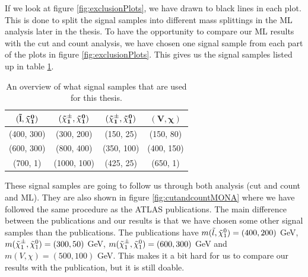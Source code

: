 If we look at figure \ref{fig:exclusionPlots}, we have drawn to black lines in each plot. This is done to split the signal samples into different mass splittings in the ML analysis later in the thesis. To have the opportunity to compare our ML results with the cut and count analysis, we have chosen one signal sample from each part of the plots in figure \ref{fig:exclusionPlots}. This gives us the signal samples listed up in table \ref{tab:sigsampcutandcount}.
\begin{table}[H]
    \centering
    \begin{tabular}{c c c c}
    \toprule
    $\mathbf{(\Tilde{l}, \Tilde{\chi}_1^0)}$ & $\mathbf{(\Tilde{\chi}_1^\pm, \Tilde{\chi}_1^0)}$ & $\mathbf{(\Tilde{\chi}_1^\pm, \Tilde{\chi}_1^0)}$ & $\mathbf{( V, \chi)}$  \\
    \midrule
    \midrule
    (400, 300) & (300, 200) & (150, 25) & (150, 80)\\
    (600, 300) & (800, 400) & (350, 100) & (400, 150)\\
    (700, 1) & (1000, 100) & (425, 25) & (650, 1)\\
    \bottomrule
    \end{tabular}
    \caption{An overview of what signal samples that are used for this thesis.}
    \label{tab:sigsampcutandcount}
\end{table}

These signal samples are going to follow us through both analysis (cut and count and ML). They are also shown in figure \ref{fig:cutandcountMONA} where we have followed the same procedure as the ATLAS publications. The main difference between the publications and our results is that we have chosen some other signal samples than the publications. The publications have $m(\Tilde{l}, \Tilde{\chi}_1^0) = (400, 200)$ GeV, $m(\Tilde{\chi}_1^\pm, \Tilde{\chi}_1^0) = (300, 50)$ GeV, $m(\Tilde{\chi}_1^\pm, \Tilde{\chi}_1^0) = (600, 300)$ GeV and $m(V, \chi) = (500,100)$ GeV. This makes it a bit hard for us to compare our results with the publication, but it is still doable. 



